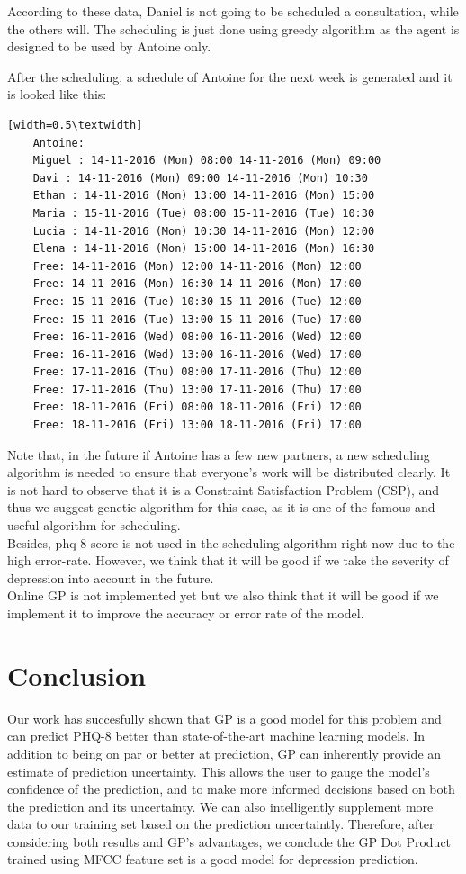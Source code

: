 \documentclass{article}
\begin{document}
	According to these data, Daniel is not going to be scheduled a consultation, while the others will.
	The scheduling is just done using greedy algorithm as the agent is designed to be used by Antoine only.

	After the scheduling, a schedule of Antoine for the next week is generated and it is looked like this:
	\begin{verbatim}[width=0.5\textwidth]
	Antoine:
	Miguel : 14-11-2016 (Mon) 08:00 14-11-2016 (Mon) 09:00
	Davi : 14-11-2016 (Mon) 09:00 14-11-2016 (Mon) 10:30
	Ethan : 14-11-2016 (Mon) 13:00 14-11-2016 (Mon) 15:00
	Maria : 15-11-2016 (Tue) 08:00 15-11-2016 (Tue) 10:30
	Lucia : 14-11-2016 (Mon) 10:30 14-11-2016 (Mon) 12:00
	Elena : 14-11-2016 (Mon) 15:00 14-11-2016 (Mon) 16:30
	Free: 14-11-2016 (Mon) 12:00 14-11-2016 (Mon) 12:00
	Free: 14-11-2016 (Mon) 16:30 14-11-2016 (Mon) 17:00
	Free: 15-11-2016 (Tue) 10:30 15-11-2016 (Tue) 12:00
	Free: 15-11-2016 (Tue) 13:00 15-11-2016 (Tue) 17:00
	Free: 16-11-2016 (Wed) 08:00 16-11-2016 (Wed) 12:00
	Free: 16-11-2016 (Wed) 13:00 16-11-2016 (Wed) 17:00
	Free: 17-11-2016 (Thu) 08:00 17-11-2016 (Thu) 12:00
	Free: 17-11-2016 (Thu) 13:00 17-11-2016 (Thu) 17:00
	Free: 18-11-2016 (Fri) 08:00 18-11-2016 (Fri) 12:00
	Free: 18-11-2016 (Fri) 13:00 18-11-2016 (Fri) 17:00
	\end{verbatim}
	
	Note that, in the future if Antoine has a few new partners, a new scheduling algorithm is needed to ensure that everyone's work will be distributed clearly.
	It is not hard to observe that it is a Constraint Satisfaction Problem (CSP), and thus we suggest genetic algorithm for this case, 
	as it is one of the famous and useful algorithm for scheduling. \\

	Besides, phq-8 score is not used in the scheduling algorithm right now due to the high error-rate. However, we think that it will be good if we take 
	the severity of depression into account in the future. \\

	Online GP is not implemented yet but we also think that it will be good if we implement it to improve the accuracy or error rate of the model.
	
	\section{Conclusion}	
	Our work has succesfully shown that GP is a good model for this problem and can predict PHQ-8 better than state-of-the-art machine learning models. 
	In addition to being on par or better at prediction, GP can inherently provide an estimate of prediction uncertainty. 
	This allows the user to gauge the model's confidence of the prediction, and to make more informed decisions based on both the prediction and its uncertainty. 
	We can also intelligently supplement more data to our training set based on the prediction uncertaintly. 
	Therefore, after considering both results and GP's advantages, we conclude the GP Dot Product trained using MFCC feature set is a good model for 
	depression prediction.
	
\end{document}
